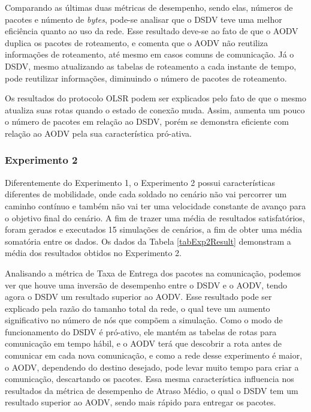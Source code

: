Comparando as \'ultimas duas m\'etricas de desempenho, sendo elas, n\'umeros de pacotes e n\'umento de \textit{bytes}, pode-se analisar que o DSDV teve uma melhor efici\^encia quanto ao uso da rede. 
Esse resultado deve-se ao fato de que o AODV duplica os pacotes de roteamento, e \cite{ramachandran} comenta que o AODV n\~ao reutiliza informa\c{c}\~oes de roteamento, at\'e mesmo em casos comuns de comunica\c{c}\~ao.
J\'a o DSDV, mesmo atualizando as tabelas de roteamento a cada instante de tempo, pode reutilizar informa\c{c}\~oes, diminuindo o n\'umero de pacotes de roteamento. 

Os resultados do protocolo OLSR podem ser explicados pelo fato de que o mesmo atualiza suas rotas quando o estado de conex\~ao muda. Assim, aumenta um pouco o n\'umero de pacotes em rela\c{c}\~ao ao DSDV, por\'em se demonstra eficiente com rela\c{c}\~ao ao AODV pela sua caracter\'istica pr\'o-ativa.

\subsubsection{Experimento 2}
Diferentemente do Experimento 1, o Experimento 2 possui caracter\'isticas diferentes de mobilidade, onde cada soldado no cen\'ario n\~ao vai percorrer um caminho cont\'inuo e tamb\'em n\~ao vai ter uma velocidade constante de avan\c{c}o para o objetivo final do cen\'ario.
A fim de trazer uma m\'edia de resultados satisfat\'orios, foram gerados e executados 15 simula\c{c}\~oes de cen\'arios, a fim de obter uma m\'edia somat\'oria entre os dados.
Os dados da Tabela \ref{tabExp2Result} demonstram a m\'edia dos resultados obtidos no Experimento 2.

Analisando a m\'etrica de Taxa de Entrega dos pacotes na comunica\c{c}\~ao, podemos ver que houve uma invers\~ao de desempenho entre o DSDV e o AODV, tendo agora o DSDV um resultado superior ao AODV.
Esse resultado pode ser explicado pela raz\~ao do tamanho total da rede, o qual teve um aumento significativo no n\'umero de n\'os que comp\~oem a simula\c{c}\~ao.
Como o modo de funcionamento do DSDV \'e pr\'o-ativo, ele mant\'em as tabelas de rotas para comunica\c{c}\~ao em tempo h\'abil, e o AODV ter\'a que descobrir a rota antes de comunicar em cada nova comunica\c{c}\~ao, e como a rede desse experimento \'e maior, o AODV, dependendo do destino desejado, pode levar muito tempo para criar a comunica\c{c}\~ao, descartando os pacotes.
Essa mesma caracter\'istica influencia nos resultados da m\'etrica de desempenho de Atraso M\'edio, o qual o DSDV tem um resultado superior ao AODV, sendo mais r\'apido para entregar os pacotes.

